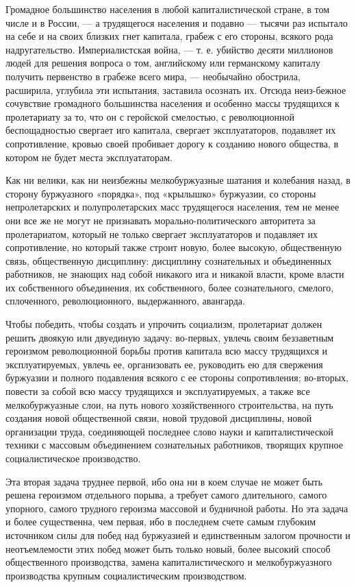 \documentclass[12pt]{article}
\newcommand{\parnum}{(\arabic{parcount})}
\newcounter{parcount}
\newenvironment{parnumbers}{%
  \par%
  \everypar{\noindent \stepcounter{parcount}\marginpar[]{\parnum}}%
}{}
\begin{document}
\begin{parnumbers}
Громадное большинство населения в любой капиталистической стране, в том числе и в России, — а трудящегося населения и подавно — тысячи раз испытало на себе и на своих близких гнет капитала, грабеж с его стороны, всякого рода надругательство. Империалистская война, — т. е. убийство десяти миллионов людей для решения вопроса о том, английскому или германскому капиталу получить первенство в грабеже всего мира, — необычайно обострила, расширила, углубила эти испытания, заставила осознать их. Отсюда неиз-бежное сочувствие громадного большинства населения и особенно массы трудящихся к пролетариату за то, что он с геройской смелостью, с революционной беспощадностью свергает иго капитала, свергает эксплуататоров, подавляет их сопротивление, кровью своей пробивает дорогу к созданию нового общества, в котором не будет места эксплуататорам.

Как ни велики, как ни неизбежны мелкобуржуазные шатания и колебания назад, в сторону буржуазного «порядка», под «крылышко» буржуазии, со стороны непролетарских и полупролетарских масс трудящегося населения, тем не менее они все же не могут не признавать морально-политического авторитета за пролетариатом, который не только свергает эксплуататоров и подавляет их сопротивление, но который также строит новую, более высокую, общественную связь, общественную дисциплину: дисциплину сознательных и объединенных работников, не знающих над собой никакого ига и никакой власти, кроме власти их собственного объединения, их собственного, более сознательного, смелого, сплоченного, революционного, выдержанного, авангарда.

Чтобы победить, чтобы создать и упрочить социализм, пролетариат должен решить двоякую или двуединую задачу: во-первых, увлечь своим беззаветным героизмом революционной борьбы против капитала всю массу трудящихся и эксплуатируемых, увлечь ее, организовать ее, руководить ею для свержения буржуазии и полного подавления всякого с ее стороны сопротивления; во-вторых, повести за собой всю массу трудящихся и эксплуатируемых, а также все мелкобуржуазные слои, на путь нового хозяйственного строительства, на путь создания новой общественной связи, новой трудовой дисциплины, новой организации труда, соединяющей последнее слово науки и капиталистической техники с массовым объединением сознательных работников, творящих крупное социалистическое производство.

Эта вторая задача труднее первой, ибо она ни в коем случае не может быть решена героизмом отдельного порыва, а требует самого длительного, самого упорного, самого трудного героизма массовой и будничной работы. Но эта задача и более существенна, чем первая, ибо в последнем счете самым глубоким источником силы для побед над буржуазией и единственным залогом прочности и неотъемлемости этих побед может быть только новый, более высокий способ общественного производства, замена капиталистического и мелкобуржуазного производства крупным социалистическим производством.
\end{parnumbers}
\end{document}
